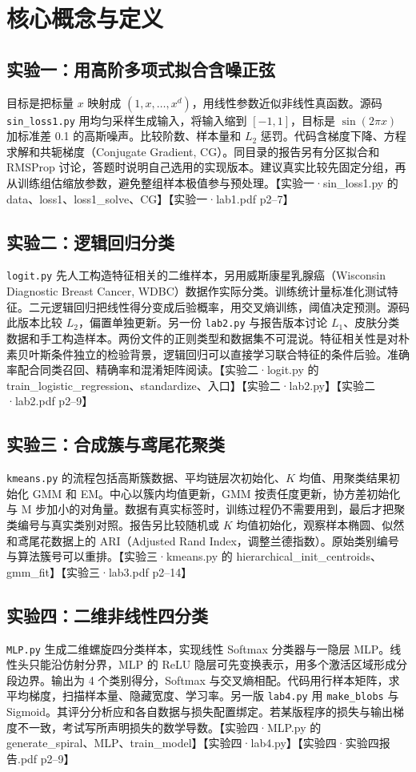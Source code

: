 \documentclass[UTF8,a4paper,zihao=-4,fontset=fandol]{ctexrep}
\begin{document}
\section{核心概念与定义}
\subsection{实验一：用高阶多项式拟合含噪正弦}
目标是把标量 $x$ 映射成 $(1,x,\ldots,x^d)$，用线性参数近似非线性真函数。源码 \texttt{sin\_loss1.py} 用均匀采样生成输入，将输入缩到 $[-1,1]$，目标是 $\sin(2\pi x)$ 加标准差 0.1 的高斯噪声。比较阶数、样本量和 $L_2$ 惩罚。代码含梯度下降、方程求解和共轭梯度（Conjugate Gradient, CG）。同目录的报告另有分区拟合和 RMSProp 讨论，答题时说明自己选用的实现版本。建议真实比较先固定分组，再从训练组估缩放参数，避免整组样本极值参与预处理。【实验一·sin\_loss1.py 的 data、loss1、loss1\_solve、CG】【实验一·lab1.pdf p2–7】

\subsection{实验二：逻辑回归分类}
\texttt{logit.py} 先人工构造特征相关的二维样本，另用威斯康星乳腺癌（Wisconsin Diagnostic Breast Cancer, WDBC）数据作实际分类。训练统计量标准化测试特征。二元逻辑回归把线性得分变成后验概率，用交叉熵训练，阈值决定预测。源码此版本比较 $L_2$，偏置单独更新。另一份 \texttt{lab2.py} 与报告版本讨论 $L_1$、皮肤分类数据和手工构造样本。两份文件的正则类型和数据集不可混说。特征相关性是对朴素贝叶斯条件独立的检验背景，逻辑回归可以直接学习联合特征的条件后验。准确率配合同类召回、精确率和混淆矩阵阅读。【实验二·logit.py 的 train\_logistic\_regression、standardize、入口】【实验二·lab2.py】【实验二·lab2.pdf p2–9】

\subsection{实验三：合成簇与鸢尾花聚类}
\texttt{kmeans.py} 的流程包括高斯簇数据、平均链层次初始化、$K$ 均值、用聚类结果初始化 GMM 和 EM。中心以簇内均值更新，GMM 按责任度更新，协方差初始化与 M 步加小的对角量。数据有真实标签时，训练过程仍不需要用到，最后才把聚类编号与真实类别对照。报告另比较随机或 $K$ 均值初始化，观察样本椭圆、似然和鸢尾花数据上的 ARI（Adjusted Rand Index，调整兰德指数）。原始类别编号与算法簇号可以重排。【实验三·kmeans.py 的 hierarchical\_init\_centroids、gmm\_fit】【实验三·lab3.pdf p2–14】

\subsection{实验四：二维非线性四分类}
\texttt{MLP.py} 生成二维螺旋四分类样本，实现线性 Softmax 分类器与一隐层 MLP。线性头只能沿仿射分界，MLP 的 ReLU 隐层可先变换表示，用多个激活区域形成分段边界。输出为 4 个类别得分，Softmax 与交叉熵相配。代码用行样本矩阵，求平均梯度，扫描样本量、隐藏宽度、学习率。另一版 \texttt{lab4.py} 用 \texttt{make\_blobs} 与 Sigmoid。其评分分析应和各自数据与损失配置绑定。若某版程序的损失与输出梯度不一致，考试写所声明损失的数学导数。【实验四·MLP.py 的 generate\_spiral、MLP、train\_model】【实验四·lab4.py】【实验四·实验四报告.pdf p2–9】
\end{document}
